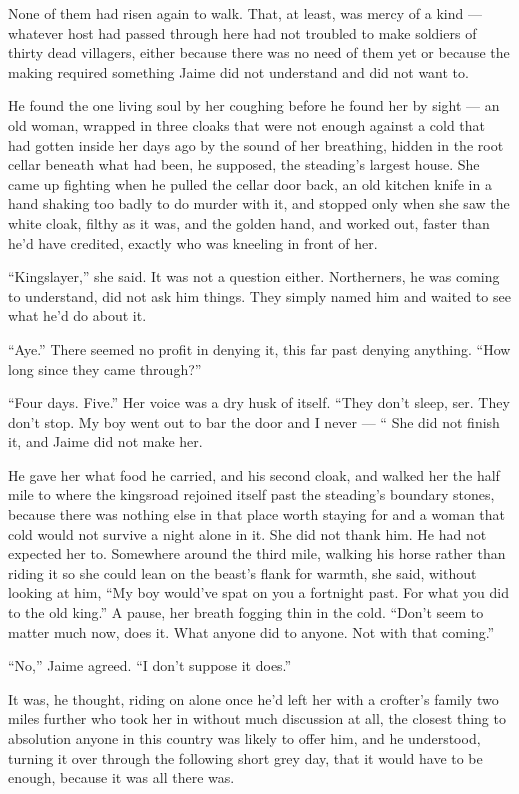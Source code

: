 None of them had risen again to walk. That, at least, was mercy of a kind — whatever host had passed through here had not troubled to make soldiers of thirty dead villagers, either because there was no need of them yet or because the making required something Jaime did not understand and did not want to.

He found the one living soul by her coughing before he found her by sight — an old woman, wrapped in three cloaks that were not enough against a cold that had gotten inside her days ago by the sound of her breathing, hidden in the root cellar beneath what had been, he supposed, the steading’s largest house. She came up fighting when he pulled the cellar door back, an old kitchen knife in a hand shaking too badly to do murder with it, and stopped only when she saw the white cloak, filthy as it was, and the golden hand, and worked out, faster than he’d have credited, exactly who was kneeling in front of her.

“Kingslayer,” she said. It was not a question either. Northerners, he was coming to understand, did not ask him things. They simply named him and waited to see what he’d do about it.

“Aye.” There seemed no profit in denying it, this far past denying anything. “How long since they came through?”

“Four days. Five.” Her voice was a dry husk of itself. “They don’t sleep, ser. They don’t stop. My boy went out to bar the door and I never — “ She did not finish it, and Jaime did not make her.

He gave her what food he carried, and his second cloak, and walked her the half mile to where the kingsroad rejoined itself past the steading’s boundary stones, because there was nothing else in that place worth staying for and a woman that cold would not survive a night alone in it. She did not thank him. He had not expected her to. Somewhere around the third mile, walking his horse rather than riding it so she could lean on the beast’s flank for warmth, she said, without looking at him, “My boy would’ve spat on you a fortnight past. For what you did to the old king.” A pause, her breath fogging thin in the cold. “Don’t seem to matter much now, does it. What anyone did to anyone. Not with that coming.”

“No,” Jaime agreed. “I don’t suppose it does.”

It was, he thought, riding on alone once he’d left her with a crofter’s family two miles further who took her in without much discussion at all, the closest thing to absolution anyone in this country was likely to offer him, and he understood, turning it over through the following short grey day, that it would have to be enough, because it was all there was.

